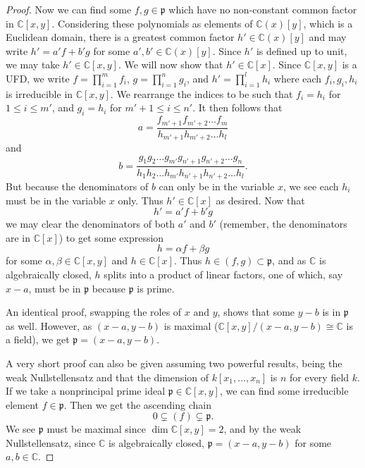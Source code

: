 \documentclass{article}
\newcommand{\C}{\mathbb{C}}
\newcommand{\frkp}{\mathfrak{p}}
\theoremstyle{definition} %
\begin{document}
\begin{proof}
    Now we can find some $f,g\in \frkp$ which have no non-constant common factor in $\C[x,y]$. Considering these polynomials as elements of $\C(x)[y]$, which is a Euclidean domain, there is a greatest common factor $h'\in \C(x)[y]$ and may write $h' = a' f+b'g$ for some $a',b'\in \C(x)[y]$. Since $h'$ is defined up to unit, we may take $h'\in \C[x,y]$. We will now show that $h'\in \C[x]$. Since $\C[x,y]$ is a UFD, we write $f=\prod_{i=1}^m f_i$, $g=\prod_{i=1}^n g_i$, and $h'=\prod_{i=1}^l h_i$ where each $f_i, g_i, h_i$ is irreducible in $\C[x,y]$. We rearrange the indices to be such that $f_i= h_i$ for $1\le i \le m'$, and $g_i = h_i$ for $m'+1\le i \le n'$. It then follows that
    \[
    a= \frac{f_{m'+1}f_{m'+2}\dots f_{m}}{h_{m'+1}h_{m'+2}\dots h_l}
    \]
    and 
    \[
    b= \frac{g_1 g_2 \dots g_{m'} g_{n'+1} g_{n'+2} \dots g_n}{h_1 h_2 \dots h_{m'} h_{n'+1} h_{n'+2} \dots h_l}.
    \]
    But because the denominators of $b$ can only be in the variable $x$, we see each $h_i$ must be in the variable $x$ only. Thus $h'\in \C[x]$ as desired. Now that
    \[
    h'=a'f+b'g
    \]
    we may clear the denominators of both $a'$ and $b'$ (remember, the denominators are in $\C[x]$) to get some expression
    \[
    h=\alpha f +\beta g
    \]
    for some $\alpha, \beta \in \C[x,y]$ and $h\in \C[x]$. Thus $h \in (f,g)\subset \frkp$, and as $\C$ is algebraically closed, $h$ splits into a product of linear factors, one of which, say $x-a$, must be in $\frkp$ because $\frkp$ is prime.

    An identical proof, swapping the roles of $x$ and $y$, shows that some $y-b$ is in $\frkp$ as well. However, as $(x-a,y-b)$ is maximal ($\C[x,y]/(x-a,y-b) \cong \C$ is a field), we get $\frkp = (x-a,y-b)$.
    \vspace{0.1in}

    A very short proof can also be given assuming two powerful results, being the weak Nullstellensatz and that the dimension of $k[x_1,\dots,x_n]$ is $n$ for every field $k$. If we take a nonprincipal prime ideal $\frkp\in \C[x,y]$, we can find some irreducible element $f\in \frkp$. Then we get the ascending chain
    \[
    0\subsetneq (f) \subsetneq \frkp.
    \]
    We see $\frkp$ must be maximal since $\dim \C[x,y]=2$, and by the weak Nullstellensatz, since $\C$ is algebraically closed, $\frkp=(x-a,y-b)$ for some $a,b\in \C$.
\end{proof}
\end{document}
